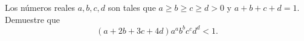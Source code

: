 Los números reales $a,b,c,d$ son tales que $a\ge b\ge c\ge d\gt 0$ y $a+b+c+d=1$.
Demuestre que
\[(a+2b+3c+4d)a^ab^bc^cd^d<1.\]